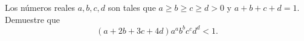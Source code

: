 Los números reales $a,b,c,d$ son tales que $a\ge b\ge c\ge d\gt 0$ y $a+b+c+d=1$.
Demuestre que
\[(a+2b+3c+4d)a^ab^bc^cd^d<1.\]